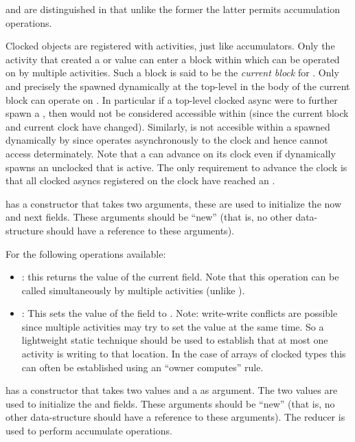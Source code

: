  and  are distinguished in that
unlike the former the latter permits accumulation operations.

Clocked objects are registered with activities, just like
accumulators.  Only the activity that created a
 or  value  can enter a
 block within which  can be operated on
by multiple activities. Such a block is said to be the {\em current
  block} for . Only and precisely the  
spawned dynamically at the top-level in the body of the current block
can operate on . In particular if a top-level clocked async
were to further spawn a , then  would
not be considered accessible within  (since the current block
and current clock have changed).  Similarly,  is not accesible within a
 spawned dynamically by  since 
operates asynchronously to the clock and hence cannot access 
determinately. Note that a  can advance on its
clock even if  dynamically spawns an unclocked 
that is active. The only requirement to advance the clock is that all
clocked asyncs registered on the clock have reached an
.


  has a constructor that takes two  arguments, these are
used to initialize the now and next fields. These arguments should be
``new'' (that is, no other data-structure should have a reference to
these arguments).

For  the following operations available:
\begin{itemize}
\item {}: this returns the value of the current field. Note
  that this operation can be called simultaneously by multiple
  activities  (unlike ).

\item {}: This sets the value of the  field to .
Note: write-write conflicts are possible since multiple activities may
try to set the value at the same time. So a lightweight static
technique should be used to establish that at most one activity is
writing to that location. In the case of arrays of clocked types this
can often be established using an ``owner computes'' rule.
\end{itemize}

 has a constructor that takes two  values and a
 as argument. The two  values are used to initialize the
 and  fields. These arguments should be ``new'' (that is, no
other data-structure should have a reference to these arguments).
The reducer is used to perform
accumulate operations.

